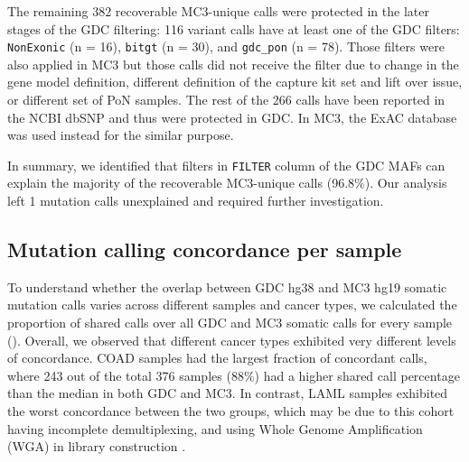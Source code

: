 The remaining 382 recoverable MC3-unique calls were protected in the later stages of the GDC filtering: 116 variant calls have at least one of the GDC filters: \texttt{NonExonic} (n = 16), \texttt{bitgt} (n = 30), and \texttt{gdc\_pon} (n = 78). Those filters were also applied in MC3 but those calls did not receive the filter due to change in the gene model definition, different definition of the capture kit set and lift over issue, or different set of PoN samples. The rest of the 266 calls have been reported in the NCBI dbSNP and thus were protected in GDC. In MC3, the ExAC database was used instead for the similar purpose.

In summary, we identified that filters in \texttt{FILTER} column of the GDC MAFs can explain the majority of the recoverable MC3-unique calls (96.8\%). Our analysis left 1 mutation calls unexplained and required further investigation.


\subsection{Mutation calling concordance per sample}
To understand whether the overlap between GDC hg38 and MC3 hg19 somatic mutation calls varies across different samples and cancer types, we calculated the proportion of shared calls over all GDC and MC3 somatic calls for every sample (). Overall, we observed that different cancer types exhibited very different levels of concordance. COAD samples had the largest fraction of concordant calls, where 243 out of the total 376 samples (88\%) had a higher shared call percentage than the median in both GDC and MC3. In contrast, LAML samples exhibited the worst concordance between the two groups, which may be due to this cohort having incomplete demultiplexing, and using Whole Genome Amplification (WGA) in library construction \cite{bodinim_rival:HiddenGenomic2015}.

